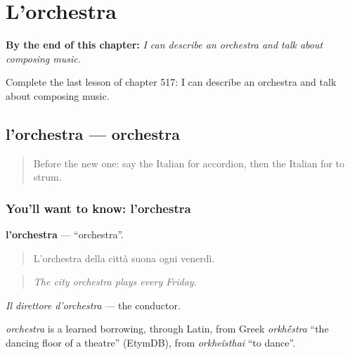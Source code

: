
\chapter{L'orchestra}
\label{ch:it-l-orchestra}

\begin{chapteropening}
\textbf{By the end of this chapter:} \emph{I can describe an orchestra and talk about composing music.}

Complete the last lesson of chapter 517: I can describe an orchestra and talk about composing music.
\end{chapteropening}

\section[l'orchestra]{l'orchestra — orchestra}

\label{lesson:IT-C517-orchestra}



\begin{quote}
Before the new one: say the Italian for accordion, then the Italian for to strum.
\end{quote}

\subsection*{You'll want to know: l'orchestra}
\textbf{l'orchestra} — \textquotedblleft{}orchestra\textquotedblright{}.

\begin{quote}
L'orchestra della città suona ogni venerdì.
\end{quote}

\begin{quote}
\emph{The city orchestra plays every Friday.}
\end{quote}

\emph{Il direttore d'orchestra} — the conductor.

\begin{cousinweb}
\emph{orchestra} is a learned borrowing, through Latin, from Greek \emph{orkh\'{\={e}}stra} \textquotedblleft{}the dancing floor of a theatre\textquotedblright{} (EtymDB), from \emph{orkheîsthai} \textquotedblleft{}to dance\textquotedblright{}.
\end{cousinweb}

